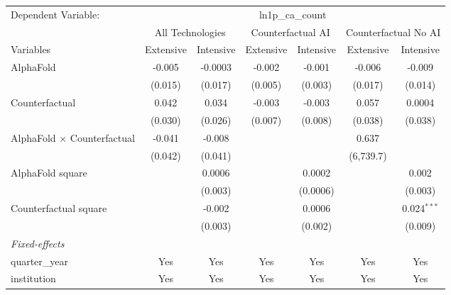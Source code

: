 \begingroup
\centering
\begin{tabular}{lcccccc}
   \tabularnewline \midrule \midrule
   Dependent Variable: & \multicolumn{6}{c}{ln1p\_ca\_count}\\
 & \multicolumn{2}{c}{All Technologies} & \multicolumn{2}{c}{Counterfactual AI} & \multicolumn{2}{c}{Counterfactual No AI} \\
\cmidrule(lr){1-1}\cmidrule(lr){2-3} \cmidrule(lr){4-5} \cmidrule(lr){6-7}
Variables & \multicolumn{1}{c}{Extensive} & \multicolumn{1}{c}{Intensive} & \multicolumn{1}{c}{Extensive} & \multicolumn{1}{c}{Intensive} & \multicolumn{1}{c}{Extensive} & \multicolumn{1}{c}{Intensive} \\
\cmidrule(lr){1-1}\cmidrule(lr){2-2} \cmidrule(lr){3-3} \cmidrule(lr){4-4} \cmidrule(lr){5-5} \cmidrule(lr){6-6} \cmidrule(lr){7-7}
   AlphaFold                          & -0.005  & -0.0003 & -0.002  & -0.001   & -0.006    & -0.009\\   
                                      & (0.015) & (0.017) & (0.005) & (0.003)  & (0.017)   & (0.014)\\   
   Counterfactual                     & 0.042   & 0.034   & -0.003  & -0.003   & 0.057     & 0.0004\\   
                                      & (0.030) & (0.026) & (0.007) & (0.008)  & (0.038)   & (0.038)\\   
   AlphaFold $\times$ Counterfactual  & -0.041  & -0.008  &         &          & 0.637     &   \\   
                                      & (0.042) & (0.041) &         &          & (6,739.7) &   \\   
   AlphaFold square                   &         & 0.0006  &         & 0.0002   &           & 0.002\\   
                                      &         & (0.003) &         & (0.0006) &           & (0.003)\\   
   Counterfactual square              &         & -0.002  &         & 0.0006   &           & 0.024$^{***}$\\   
                                      &         & (0.003) &         & (0.002)  &           & (0.009)\\   
   \midrule
   \emph{Fixed-effects}\\
   quarter\_year                      & Yes     & Yes     & Yes     & Yes      & Yes       & Yes\\  
   institution                        & Yes     & Yes     & Yes     & Yes      & Yes       & Yes\\  

\end{tabular}
